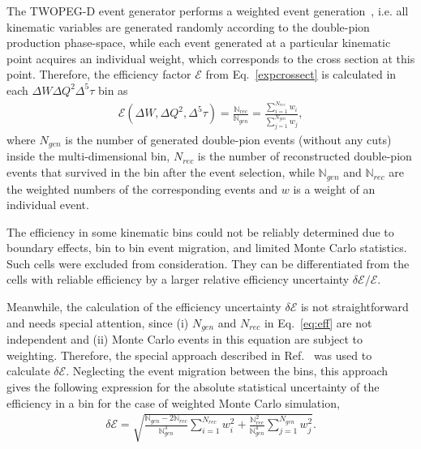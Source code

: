 The TWOPEG-D event generator performs a weighted event generation~\cite{twopeg}, i.e. all kinematic variables are generated randomly according to the double-pion production phase-space, while each event generated at a particular kinematic point acquires an individual weight, which corresponds to the cross section at this point.  Therefore, the efficiency factor $\mathcal{E}$ from Eq.~\eqref{expcrossect} is calculated in each $\Delta W\Delta Q^2\Delta^{5}\tau$ bin as\vspace{-0.5em}
\begin{equation}
\begin{aligned}
\mathcal{E}(\Delta W, \Delta Q^2, \Delta^{5}\tau) = \frac{\mathbb{N}_{rec}}{\mathbb{N}_{gen}} =  \frac{\sum\limits_{i=1}^{N_{rec}} w_{i}}{\sum\limits_{j=1}^{N_{gen}} w_{j}} ,
\end{aligned}
\label{eq:eff}
\end{equation}
where $N_{gen}$ is the number of generated double-pion events (without any cuts) inside the multi-dimensional bin, $N_{rec}$ is the number of reconstructed double-pion events that survived in the bin after the event selection, while $\mathbb{N}_{gen}$ and  $\mathbb{N}_{rec}$ are the weighted numbers of the corresponding events and $w$ is a weight of an individual event.

The efficiency in some kinematic bins could not be reliably determined due to boundary effects, bin to bin event migration, and limited Monte Carlo statistics. Such cells were excluded from consideration. They can be differentiated from the cells with reliable efficiency by a larger relative efficiency uncertainty $\delta \mathcal{E}/\mathcal{E}$.



Meanwhile, the calculation of the efficiency uncertainty $\delta \mathcal{E}$ is not straightforward and needs special attention, since (i) $N_{gen}$ and $N_{rec}$ in Eq.~\eqref{eq:eff} are not independent and (ii) Monte Carlo events in this equation are subject to weighting. Therefore, the special approach described in Ref.~\cite{Laforge:1996ts} was used to calculate $\delta \mathcal{E}$. Neglecting the event migration between the bins, this approach gives the following expression for the absolute statistical uncertainty of the efficiency in a bin for the case of weighted Monte Carlo simulation,
\begin{equation}
\begin{aligned}
\delta \mathcal{E} = \sqrt{\frac{\mathbb{N}_{gen} - 2\mathbb{N}_{rec}}{\mathbb{N}_{gen}^{3}}\sum\limits_{i=1}^{N_{rec}} w_{i}^{2} + \frac{\mathbb{N}_{rec}^{2}}{\mathbb{N}_{gen}^{4}}\sum\limits_{j=1}^{N_{gen}} w_{j}^{2}}.
\end{aligned}
\label{eq:eff_err_weighted}
\end{equation}


